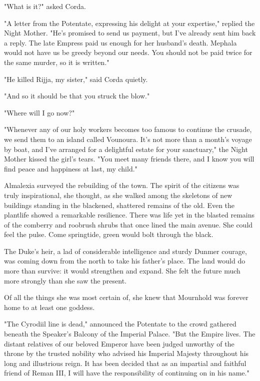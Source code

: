 "What is it?" asked Corda.

"A letter from the Potentate, expressing his delight at your expertise," replied the Night Mother. "He's promised to send us payment, but I've already sent him back a reply. The late Empress paid us enough for her husband's death. Mephala would not have us be greedy beyond our needs. You should not be paid twice for the same murder, so it is written."

"He killed Rijja, my sister," said Corda quietly.

"And so it should be that you struck the blow."

"Where will I go now?"

"Whenever any of our holy workers becomes too famous to continue the crusade, we send them to an island called Vounoura. It's not more than a month's voyage by boat, and I've arranged for a delightful estate for your sanctuary," the Night Mother kissed the girl's tears. "You meet many friends there, and I know you will find peace and happiness at last, my child."

Almalexia surveyed the rebuilding of the town. The spirit of the citizens was truly inspirational, she thought, as she walked among the skeletons of new buildings standing in the blackened, shattered remains of the old. Even the plantlife showed a remarkable resilience. There was life yet in the blasted remains of the comberry and roobrush shrubs that once lined the main avenue. She could feel the pulse. Come springtide, green would bolt through the black.

The Duke's heir, a lad of considerable intelligence and sturdy Dunmer courage, was coming down from the north to take his father's place. The land would do more than survive: it would strengthen and expand. She felt the future much more strongly than she saw the present.

Of all the things she was most certain of, she knew that Mournhold was forever home to at least one goddess.

"The Cyrodiil line is dead," announced the Potentate to the crowd gathered beneath the Speaker's Balcony of the Imperial Palace. "But the Empire lives. The distant relatives of our beloved Emperor have been judged unworthy of the throne by the trusted nobility who advised his Imperial Majesty throughout his long and illustrious reign. It has been decided that as an impartial and faithful friend of Reman III, I will have the responsibility of continuing on in his name."

